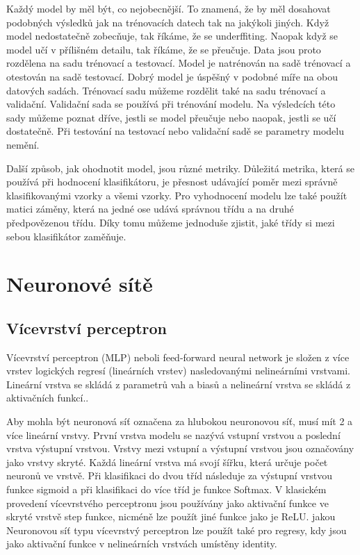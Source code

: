 \documentclass[FM,BP]{tulthesis}
\begin{document}
Každý model by měl být, co nejobecnější. To znamená, že by měl dosahovat podobných výsledků jak na trénovacích datech tak na jakýkoli jiných. Když model nedostatečně zobecňuje, tak říkáme, že se underffiting. Naopak když se model učí v přílišném detailu, tak říkáme, že se přeučuje. Data jsou proto rozdělena na sadu trénovací a testovací. Model je natrénován na sadě trénovací a otestován na sadě testovací. Dobrý model je úspěšný v podobné míře na obou datových sadách. Trénovací sadu můžeme rozdělit také na sadu trénovací a validační. Validační sada se používá při trénování modelu. Na výsledcích této sady můžeme poznat dříve, jestli se model přeučuje nebo naopak, jestli se učí dostatečně. Při testování na testovací nebo validační sadě se parametry modelu nemění. 

Další způsob, jak ohodnotit model, jsou různé metriky. Důležitá metrika, která se používá při hodnocení klasifikátoru, je přesnost udávající poměr mezi správně klasifikovanými vzorky a všemi vzorky. Pro vyhodnocení modelu lze také použít matici záměny, která na jedné ose udává správnou třídu a na druhé předpovězenou třídu. Díky tomu můžeme jednoduše zjistit, jaké třídy si mezi sebou klasifikátor zaměňuje.

\section{Neuronové sítě}

\subsection{Vícevrství perceptron}
Vícevrství perceptron (MLP) neboli feed-forward neural network je složen z více vrstev logických regresí (lineárních vrstev) nasledovanými nelineárními vrstvami. Lineární vrstva se skládá z parametrů vah a biasů a nelineární vrstva se skládá z aktivačních funkcí.\cite{DBLP:books/lib/Bishop07}.

Aby mohla být neuronová síť označena za hlubokou neuronovou síť, musí mít 2 a více lineární vrstvy. První vrstva modelu se nazývá vstupní vrstvou a poslední vrstva výstupní vrstvou. Vrstvy mezi vstupní a výstupní vrstvou jsou označovány jako vrstvy skryté. Každá lineární vrstva má svojí šířku, která určuje počet neuronů ve vrstvě. Při klasifikaci do dvou tříd následuje za výstupní vrstvou funkce sigmoid a při klasifikaci do více tříd je funkce Softmax. V klasickém provedení vícevrstvého perceptronu jsou používány jako aktivační funkce ve skryté vrstvě step funkce, nicméně lze použít jiné funkce jako je ReLU. jakou Neuronovou síť typu vícevrstvý perceptron lze použít také pro regresy, kdy jsou jako aktivační funkce v nelineárních vrstvách umístěny identity\cite{DBLP:books/lib/Bishop07}.
\end{document}
